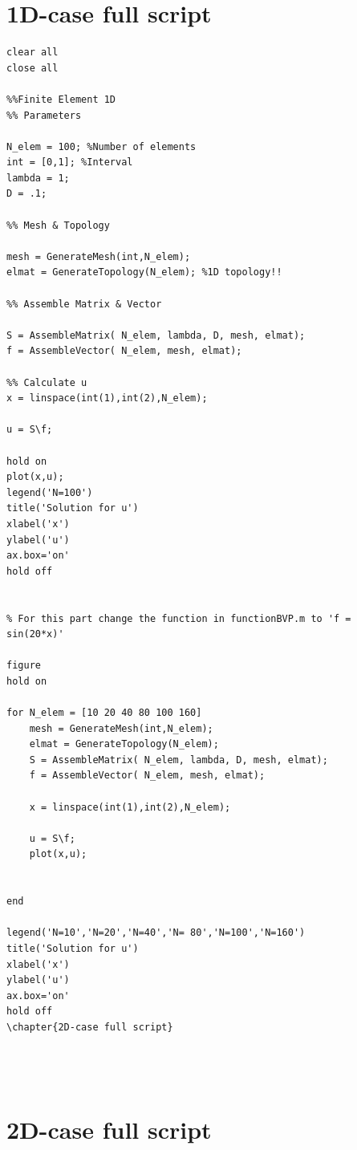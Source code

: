 \documentclass[a4paper]{report}
\begin{document}
\newpage

\appendix

\begin{appendices}
\chapter{1D-case full script}


\begin{lstlisting}
clear all
close all

%%Finite Element 1D
%% Parameters

N_elem = 100; %Number of elements
int = [0,1]; %Interval
lambda = 1;
D = .1;

%% Mesh & Topology

mesh = GenerateMesh(int,N_elem);
elmat = GenerateTopology(N_elem); %1D topology!!

%% Assemble Matrix & Vector

S = AssembleMatrix( N_elem, lambda, D, mesh, elmat);
f = AssembleVector( N_elem, mesh, elmat);

%% Calculate u
x = linspace(int(1),int(2),N_elem);

u = S\f;

hold on
plot(x,u); 
legend('N=100')
title('Solution for u')
xlabel('x')
ylabel('u')
ax.box='on'
hold off


% For this part change the function in functionBVP.m to 'f = sin(20*x)'

figure 
hold on

for N_elem = [10 20 40 80 100 160]
	mesh = GenerateMesh(int,N_elem);
	elmat = GenerateTopology(N_elem);
	S = AssembleMatrix( N_elem, lambda, D, mesh, elmat);
	f = AssembleVector( N_elem, mesh, elmat);

	x = linspace(int(1),int(2),N_elem);

	u = S\f;
	plot(x,u);


end

legend('N=10','N=20','N=40','N= 80','N=100','N=160')
title('Solution for u')
xlabel('x')
ylabel('u')
ax.box='on'
hold off
\chapter{2D-case full script}




\end{lstlisting}

\chapter{2D-case full script}
\end{appendices}
\end{document}
